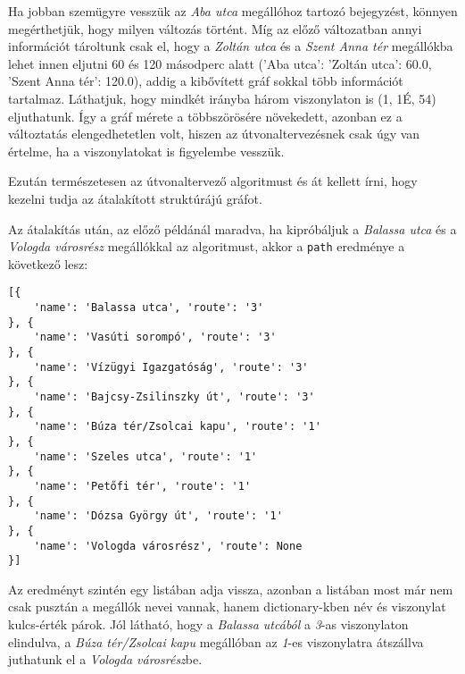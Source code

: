 Ha jobban szemügyre vesszük az \textit{Aba utca} megállóhoz tartozó bejegyzést, könnyen megérthetjük, hogy milyen változás történt. Míg az előző változatban annyi információt tároltunk csak el, hogy a \textit{Zoltán utca} és a \textit{Szent Anna tér} megállókba lehet innen eljutni 60 és 120 másodperc alatt ('Aba utca': {'Zoltán utca': 60.0, 'Szent Anna tér': 120.0}), addig a kibővített gráf sokkal több információt tartalmaz. Láthatjuk, hogy mindkét irányba három viszonylaton is (1, 1É, 54) eljuthatunk. Így a gráf mérete a többszörösére növekedett, azonban ez a változtatás elengedhetetlen volt, hiszen az útvonaltervezésnek csak úgy van értelme, ha a viszonylatokat is figyelembe vesszük.

Ezután természetesen az útvonaltervező algoritmust és át kellett írni, hogy kezelni tudja az átalakított struktúrájú gráfot.

Az átalakítás után, az előző példánál maradva, ha kipróbáljuk a \textit{Balassa utca} és a \textit{Vologda városrész} megállókkal az algoritmust, akkor a \texttt{path} eredménye a következő lesz:

\begin{verbatim}
[{
    'name': 'Balassa utca', 'route': '3'
}, {
    'name': 'Vasúti sorompó', 'route': '3'
}, {
    'name': 'Vízügyi Igazgatóság', 'route': '3'
}, {
    'name': 'Bajcsy-Zsilinszky út', 'route': '3'
}, {
    'name': 'Búza tér/Zsolcai kapu', 'route': '1'
}, {
    'name': 'Szeles utca', 'route': '1'
}, {
    'name': 'Petőfi tér', 'route': '1'
}, {
    'name': 'Dózsa György út', 'route': '1'
}, {
    'name': 'Vologda városrész', 'route': None
}]
\end{verbatim}

Az eredményt szintén egy listában adja vissza, azonban a listában most már nem csak pusztán a megállók nevei vannak, hanem dictionary-kben név és viszonylat kulcs-érték párok. Jól látható, hogy a \textit{Balassa utcából} a \textit{3}-as viszonylaton elindulva, a \textit{Búza tér/Zsolcai kapu} megállóban az \textit{1}-es viszonylatra átszállva juthatunk el a \textit{Vologda városrész}be.
